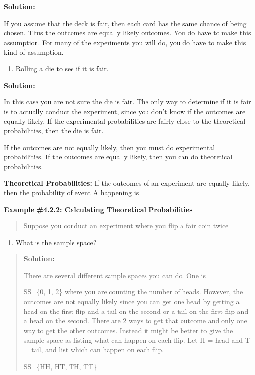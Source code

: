 \documentclass[]{book}
\providecommand{\tightlist}{%
  \setlength{\itemsep}{0pt}\setlength{\parskip}{0pt}}
\begin{document}
\textbf{Solution:}

If you assume that the deck is fair, then each card has the same
chance of being chosen. Thus the outcomes are equally likely
outcomes. You do have to make this assumption. For many of the
experiments you will do, you do have to make this kind of
assumption.

\begin{enumerate}
\def\labelenumi{\alph{enumi}.}
\setcounter{enumi}{4}
\tightlist
\item
  Rolling a die to see if it is fair.
\end{enumerate}

\textbf{Solution:}

In this case you are not sure the die is fair. The only way to
determine if it is fair is to actually conduct the experiment, since
you don't know if the outcomes are equally likely. If the
experimental probabilities are fairly close to the theoretical
probabilities, then the die is fair.

If the outcomes are not equally likely, then you must do experimental
probabilities. If the outcomes are equally likely, then you can do
theoretical probabilities.

\textbf{Theoretical Probabilities:} If the outcomes of an experiment are
equally likely, then the probability of event A happening is

\textbf{Example \#4.2.2: Calculating Theoretical Probabilities}

\begin{quote}
Suppose you conduct an experiment where you flip a fair coin twice
\end{quote}

\begin{enumerate}
\def\labelenumi{\alph{enumi}.}
\tightlist
\item
  What is the sample space?
\end{enumerate}

\begin{quote}
\textbf{Solution:}

There are several different sample spaces you can do. One is

SS=\{0, 1, 2\} where you are counting the number of heads. However, the
outcomes are not equally likely since you can get one head by getting
a head on the first flip and a tail on the second or a tail on the
first flip and a head on the second. There are 2 ways to get that
outcome and only one way to get the other outcomes. Instead it might
be better to give the sample space as listing what can happen on each
flip. Let H = head and T = tail, and list which can happen on each
flip.

SS=\{HH, HT, TH, TT\}
\end{quote}
\end{document}
